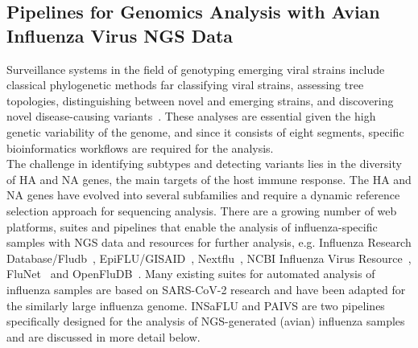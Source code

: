 \subsection{Pipelines for Genomics Analysis with Avian Influenza Virus NGS Data}
Surveillance systems in the field of genotyping emerging viral strains include classical phylogenetic methods far classifying viral strains, assessing tree topologies, distinguishing between novel and emerging strains, and discovering novel disease-causing variants~\cite{koboldt2013next}. These analyses are essential given the high genetic variability of the genome, and since it consists of eight segments, specific bioinformatics workflows are required for the analysis. \\
The challenge in identifying subtypes and detecting variants lies in the diversity of HA and NA genes, the main targets of the host immune response. The HA and NA genes have evolved into several subfamilies and require a dynamic reference selection approach for sequencing analysis. There are a growing number of web platforms, suites and pipelines that enable the analysis of influenza-specific samples with NGS data and resources for further analysis, e.g. Influenza Research Database/Fludb~\cite{zhang2017influenza}, EpiFLU/GISAID~\cite{shu2017gisaid}, Nextflu~\cite{neher2015nextflu}, NCBI Influenza Virus Resource~\cite{bao2008influenza}, FluNet~\cite{flahault1998flunet} and OpenFluDB~\cite{liechti2010openfludb}. Many existing suites for automated analysis of influenza samples are based on SARS-CoV-2 research and have been adapted for the similarly large influenza genome. INSaFLU and PAIVS are two pipelines specifically designed for the analysis of NGS-generated (avian) influenza samples and are discussed in more detail below.

